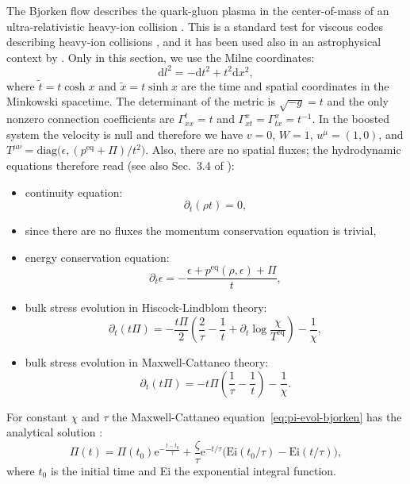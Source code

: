 \documentclass[aps,prd,twocolumn,a4paper,floatfix,nofootbib,superscriptaddress,nofootinbib]{revtex4}
\newcommand{\req}{\mathrm{eq}}
\begin{document}
The Bjorken flow describes the quark-gluon plasma in the center-of-mass
of an ultra-relativistic heavy-ion collision \citep{Bjorken83}.
This is a standard test for viscous codes describing heavy-ion collisions \cite{DelZanna13},
and it has been used also in an astrophysical context by \citet{Chabanov_2021}.
Only in this section, we use the Milne coordinates:
%
\begin{equation}
\label{eq:milne}
\mathrm dl^2= - \mathrm d t^2 + t^2\mathrm dx^2,
\end{equation}
%
where $\tilde t= t\cosh x$ and $\tilde x=t\sinh x$ are the
time and spatial coordinates in the Minkowski spacetime.
The determinant of the metric is $\sqrt{-g}= t$ and the only nonzero connection coefficients are 
$\Gamma^{t}_{xx}=t$ and
$\Gamma^{x}_{xt}=\Gamma^{x}_{tx}= t^{-1}$.
In the boosted system the velocity is null and therefore we have $v=0$, $W=1$, $u^\mu=(1,0)$, and
$T^{\mu\nu}=\mathrm{diag}\big(\epsilon,(p^\req+\Pi)/t^2\big)$.
Also, there are no spatial fluxes;
the hydrodynamic equations therefore read (see also Sec.~3.4 of \citet{DelZanna13}):
%
\begin{itemize}
\item continuity equation:
\begin{equation}
\partial_t(\rho t)=0,
\end{equation}
\item since there are no fluxes the momentum conservation equation is trivial,
\item energy conservation equation:
\begin{equation}
\partial_t\epsilon=-\frac{\epsilon+p^\req(\rho,\epsilon)+\Pi}t,
\end{equation}
\item bulk stress evolution in Hiscock-Lindblom theory:
\begin{equation}
\label{eq:pi-evol-hl-bjorken}
\partial_t (t\Pi)= -\frac{t\Pi}2\left(\frac2{\tau}-\frac1t+\partial_t\log\frac\chi{T^\req}\right)-\frac1\chi,
\end{equation}
\item bulk stress evolution in Maxwell-Cattaneo theory:
\begin{equation}
\label{eq:pi-evol-bjorken}
\partial_t (t\Pi)=-t\Pi\left(\frac1{\tau}-\frac1t\right) -\frac1\chi.
\end{equation}
\end{itemize}
%
For constant $\chi$ and $\tau$ the Maxwell-Cattaneo equation~\eqref{eq:pi-evol-bjorken} has the analytical solution \cite{DelZanna13}:
%
\begin{equation}
\label{eq:bjorken-flow}
\Pi(t)=\Pi(t_0)\mathrm e^{-\frac{t-t_0}{\tau}} + \frac{\zeta}{\tau}\mathrm e^{-t/\tau}
\big(\mathrm{Ei}(t_0/\tau) - \mathrm{Ei}(t/\tau)\big),
\end{equation}
%
where $t_0$ is the initial time and Ei the exponential integral function.
\end{document}
